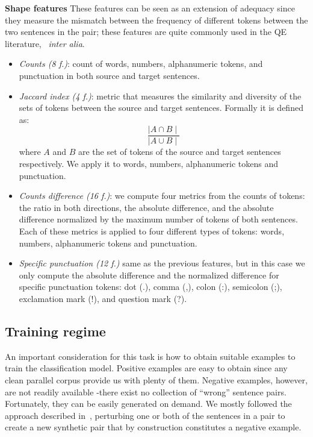 \textbf{Shape features} These features can be seen as an extension of adequacy since they measure the mismatch between the frequency of different tokens between the two sentences in the pair; these features are quite commonly used in the QE literature,~\cite{specia15} \textit{inter alia}.
\begin{itemize}
\item \textit{Counts (8 f.)}: count of words, numbers, alphanumeric tokens, and punctuation in both source and target sentences.
\item \textit{Jaccard index (4 f.)}: metric that measures the similarity and diversity of the sets of tokens between the source and target sentences. Formally it is defined as:
$$ \frac{\mid A\cap B\mid}{\mid A\cup B\mid}$$
where $A$ and $B$ are the set of tokens of the source and target sentences respectively. We apply it to words, numbers, alphanumeric tokens and punctuation.
\item \textit{Counts difference (16 f.)}: we compute four metrics from the counts of tokens: the ratio in both directions, the absolute difference, and the absolute difference normalized by the maximum number of tokens of both sentences. Each of these metrics is applied to four different types of tokens: words, numbers, alphanumeric tokens and punctuation.
\item \textit{Specific punctuation (12 f.)} same as the previous features, but in this case we only compute the absolute difference and the normalized difference for specific punctuation tokens: dot (.), comma (,), colon (:), semicolon (;), exclamation mark (!), and question mark (?).
\end{itemize}


\subsection{Training regime}
\label{ssec:training}

An important consideration for this task is how to obtain suitable examples to train the classification model. Positive examples are easy to obtain since any clean parallel corpus provide us with plenty of them. Negative examples, however, are not readily available -there exist no collection of ``wrong'' sentence pairs. Fortunately, they can be easily generated on demand. We mostly followed the approach described in~\cite{Hainan17}, perturbing one or both of the sentences in a pair to create a new synthetic pair that by construction constitutes a negative example.

